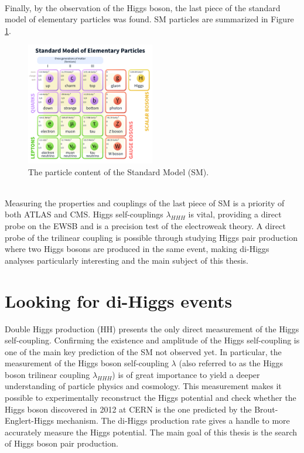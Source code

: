 \\
Finally, by the observation of the Higgs boson, the last piece of the standard model of elementary particles was found. SM particles are summarized in Figure \ref{fig:chap1:H2012:SM}. 
\begin{figure}[htbp]
    \centering
    \includegraphics[width=0.5\textwidth]{Ch1/Img/SM_particles.png}
    \caption{The particle content of the Standard Model (SM).}
    \label{fig:chap1:H2012:SM}
\end{figure}
\\
Measuring the properties and couplings of the last piece of SM is a priority of both ATLAS and CMS. Higgs self-couplings $\lambda_{HHH}$ is vital, providing a direct probe on the EWSB and is a precision test of the electroweak theory. A direct probe of the trilinear coupling is possible through studying Higgs pair production where two Higgs bosons are produced in the same event, making di-Higgs analyses particularly interesting and the main subject of this thesis.
\clearpage
\section{Looking for di-Higgs events}
\label{chap1:HH}
Double Higgs production (HH) presents the only direct measurement of the Higgs self-coupling. Confirming the existence and amplitude of the Higgs self-coupling is one of the main key prediction of the SM not observed yet. In particular, the measurement of the Higgs boson self-coupling $\lambda$ (also referred to as the Higgs boson trilinear coupling $\lambda_{HHH}$) is of great importance to yield a deeper understanding of particle physics and cosmology. This measurement makes it possible to experimentally reconstruct the Higgs potential and check whether the Higgs boson discovered in 2012 at CERN is the one predicted by the Brout-Englert-Higgs mechanism. The di-Higgs production rate gives a handle to more accurately measure the Higgs potential. The main goal of this thesis is the search of Higgs boson pair production.
